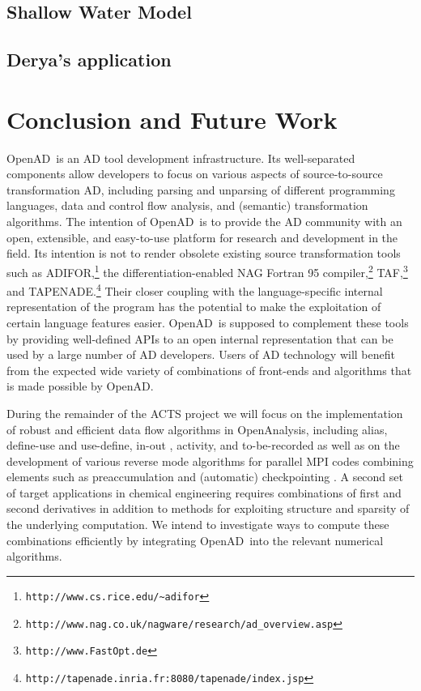 \documentclass[acmtocl,acmnow]{acmtrans2m}
\newcommand{\OpenAD}{OpenAD}
\newcommand{\OpenAnalysis}{OpenAnalysis}
\begin{document}
\subsection{Shallow Water Model}
\subsection{Derya's application}
\section*{Conclusion and Future Work}

\OpenAD\ is an AD tool development infrastructure. Its well-separated components
allow developers to focus on various aspects of source-to-source 
transformation AD, including parsing and unparsing of different programming
languages, data and control flow analysis, and (semantic) transformation 
algorithms. The intention of \OpenAD\ is to provide the AD community with 
an open, extensible, and easy-to-use platform for research and development
in the field. Its intention is not to render obsolete existing source transformation
tools such as ADIFOR,\footnote{{\tt http://www.cs.rice.edu/\~\!adifor}} 
the differentiation-enabled NAG Fortran 95 
compiler,\footnote{{\tt http://www.nag.co.uk/nagware/research/ad\_overview.asp}} TAF,\footnote{{\tt http://www.FastOpt.de}} and TAPENADE.\footnote{{\tt http://tapenade.inria.fr:8080/tapenade/index.jsp}} 
Their closer coupling with the language-specific internal representation of 
the program has the potential to make the
exploitation of certain language features easier. \OpenAD\ is supposed to 
complement these tools by providing well-defined APIs to an open internal 
representation that can be used by a large number of AD developers.
Users of AD technology will benefit from the expected wide
variety of combinations of front-ends and algorithms that is made possible
by \OpenAD.

During the remainder of the ACTS project we will focus on the implementation
of robust and efficient data flow algorithms in \OpenAnalysis, including alias, 
define-use and use-define, in-out \cite{Muc97}, 
activity, and to-be-recorded \cite{HNP02} as well as on 
the development of various reverse mode algorithms for parallel MPI codes
combining elements such as preaccumulation and (automatic) checkpointing
\cite{Gri92}. 
A second set of target 
applications in chemical engineering \cite{FTB97} requires combinations of first and 
second derivatives in addition to methods for exploiting structure and sparsity
of the underlying computation. We intend to investigate ways to compute these
combinations efficiently by integrating \OpenAD\ into the relevant 
numerical algorithms.
\end{document}
